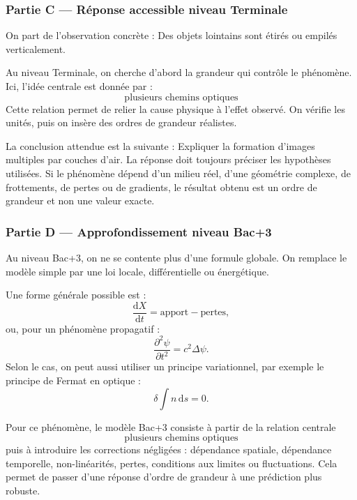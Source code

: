 \documentclass[11pt,a4paper]{article}
\begin{document}
\subsubsection*{Partie C — Réponse accessible niveau Terminale}

\begin{corrigebox}
On part de l'observation concrète : Des objets lointains sont étirés ou empilés verticalement.

Au niveau Terminale, on cherche d'abord la grandeur qui contrôle le phénomène. Ici, l'idée centrale est donnée par :
\[
\text{plusieurs chemins optiques}
\]
Cette relation permet de relier la cause physique à l'effet observé. On vérifie les unités, puis on insère des ordres de grandeur réalistes.

La conclusion attendue est la suivante : Expliquer la formation d'images multiples par couches d'air. La réponse doit toujours préciser les hypothèses utilisées. Si le phénomène dépend d'un milieu réel, d'une géométrie complexe, de frottements, de pertes ou de gradients, le résultat obtenu est un ordre de grandeur et non une valeur exacte.
\end{corrigebox}

\subsubsection*{Partie D — Approfondissement niveau Bac+3}

\begin{approfondissementbox}
Au niveau Bac+3, on ne se contente plus d'une formule globale. On remplace le modèle simple par une loi locale, différentielle ou énergétique.

Une forme générale possible est :
\[
\frac{\mathrm d X}{\mathrm dt}=\text{apport}-\text{pertes},
\]
ou, pour un phénomène propagatif :
\[
\frac{\partial^2 \psi}{\partial t^2}=c^2\Delta\psi.
\]
Selon le cas, on peut aussi utiliser un principe variationnel, par exemple le principe de Fermat en optique :
\[
\delta \int n\,\mathrm ds=0.
\]

Pour ce phénomène, le modèle Bac+3 consiste à partir de la relation centrale
\[
\text{plusieurs chemins optiques}
\]
puis à introduire les corrections négligées : dépendance spatiale, dépendance temporelle, non-linéarités, pertes, conditions aux limites ou fluctuations. Cela permet de passer d'une réponse d'ordre de grandeur à une prédiction plus robuste.
\end{approfondissementbox}
\end{document}
